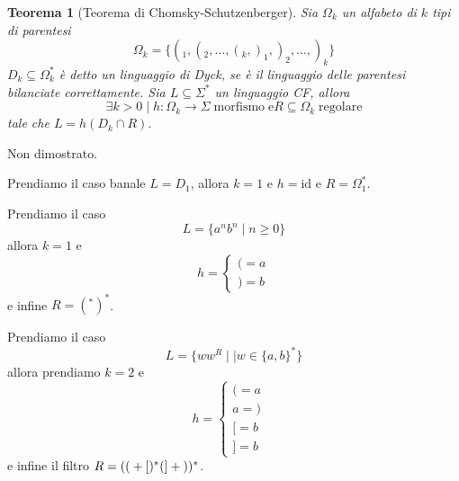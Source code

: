 \documentclass[12pt]{article}
\newtheorem{teorema}{Teorema}
\begin{document}
\begin{teorema}[Teorema di Chomsky-Schutzenberger]	%
	Sia $\Omega_k$ un alfabeto di $k$ tipi di parentesi
	$$ \Omega_k = \{ (_1, (_2, \dots, (_k, )_1, )_2, \dots, )_k \} $$
	$D_k \subseteq \Omega_k^*$ è detto un linguaggio di Dyck, se è il linguaggio delle parentesi bilanciate correttamente.
	Sia $L \subseteq \Sigma^*$ un linguaggio CF, allora 
	$$ \exists k > 0 \mid h : \Omega_k \rightarrow \Sigma \; \text{morfismo} \; \text{e} R \subseteq \Omega_k \; \text{regolare} $$
	tale che $L = h(D_k \cap R)$.
\end{teorema}
Non dimostrato.

\begin{tcolorbox}[breakable]
	Prendiamo il caso banale $L = D_1$, allora $k = 1$ e $h = \text{id}$ e $R = \Omega_1^*$.
\end{tcolorbox}
\begin{tcolorbox}[breakable]
	Prendiamo il caso 
	$$L = \{ a^n b^n \mid n \geq 0 \} $$
	allora $k = 1$ e 
	$$ h = \begin{cases} ( = a \\ ) = b \end{cases} $$ 
	e infine $R = (^* )^*$.
\end{tcolorbox}

\begin{tcolorbox}[breakable]
	Prendiamo il caso 
	$$L = \{ w w^R \mid \mid w \in \{a, b\}^* \} $$
	allora prendiamo $k = 2$ e 
	$$ h = \begin{cases} ( = a & \\ a = ) \\ [ = b \\ ] = b \end{cases} $$ 
	e infine il filtro $R = (\text{\texttt{$($}} + \text{\texttt{$[$}})^* (\text{\texttt{$]$}} + \text{\texttt{$)$}})^*$.
\end{tcolorbox}
\end{document}
